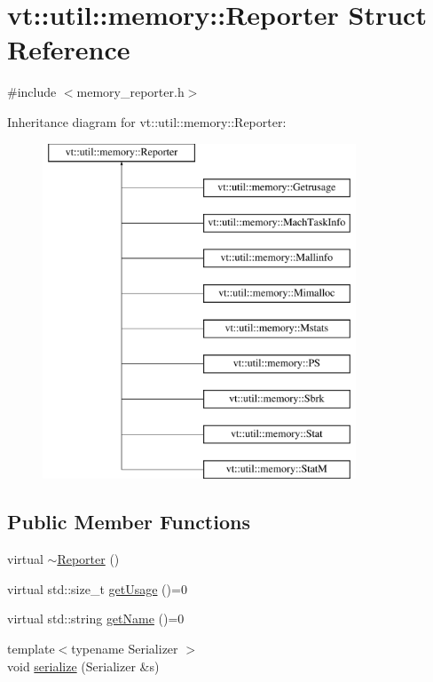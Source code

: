 \hypertarget{structvt_1_1util_1_1memory_1_1_reporter}{}\section{vt\+:\+:util\+:\+:memory\+:\+:Reporter Struct Reference}
\label{structvt_1_1util_1_1memory_1_1_reporter}


{\ttfamily \#include $<$memory\+\_\+reporter.\+h$>$}

Inheritance diagram for vt\+:\+:util\+:\+:memory\+:\+:Reporter\+:\begin{figure}[H]
\begin{center}
\leavevmode
\includegraphics[height=10.000000cm]{structvt_1_1util_1_1memory_1_1_reporter}
\end{center}
\end{figure}
\subsection*{Public Member Functions}
\begin{DoxyCompactItemize}
\item 
virtual \hyperlink{structvt_1_1util_1_1memory_1_1_reporter_a9b5c8c4345a2e1d758fd9f583d5ea63a}{$\sim$\+Reporter} ()
\item 
virtual std\+::size\+\_\+t \hyperlink{structvt_1_1util_1_1memory_1_1_reporter_a372574f51fdb68077cd3d227ee373de5}{get\+Usage} ()=0
\item 
virtual std\+::string \hyperlink{structvt_1_1util_1_1memory_1_1_reporter_a83fc36e9cff3ce2deedf1d4546694713}{get\+Name} ()=0
\item 
{\footnotesize template$<$typename Serializer $>$ }\\void \hyperlink{structvt_1_1util_1_1memory_1_1_reporter_af00503d786ee4c923b0a942e52af0429}{serialize} (Serializer \&s)
\end{DoxyCompactItemize}


